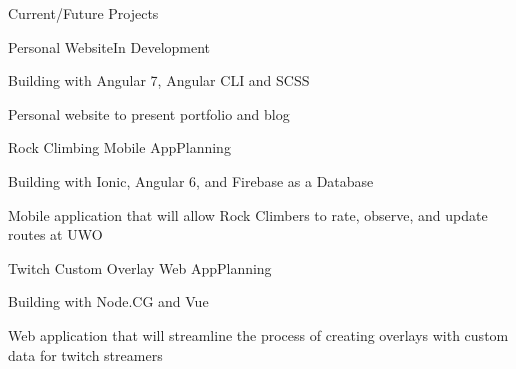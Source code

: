 \documentclass{resume} %
\begin{document}
\begin{rSection}{Current/Future Projects}
    
    \begin{rSubsection}{Personal Website}{}{In Development}{}
        \item Building with Angular 7, Angular CLI and SCSS
        \item Personal website to present portfolio and blog
    \end{rSubsection}
    
    \begin{rSubsection}{Rock Climbing Mobile App}{}{Planning}{}
        \item Building with Ionic, Angular 6, and Firebase as a Database
        \item Mobile application that will allow Rock Climbers to rate, observe, and update routes at UWO
    \end{rSubsection}
    
    \begin{rSubsection}{Twitch Custom Overlay Web App}{}{Planning}{}
        \item Building with Node.CG and Vue
        \item Web application that will streamline the process of creating overlays with custom data for twitch streamers 
    \end{rSubsection}
    
\end{rSection}
\end{document}
